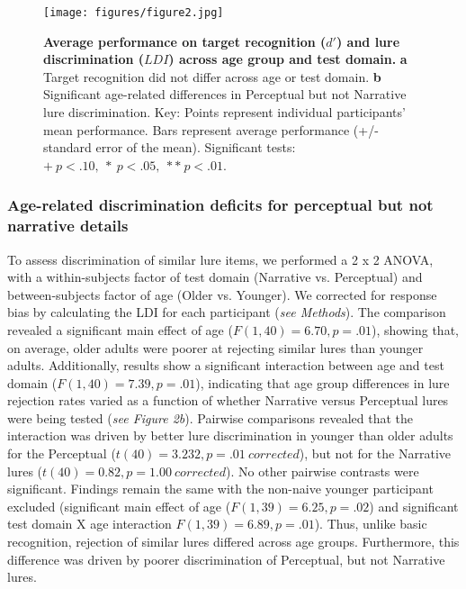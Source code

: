 \documentclass[11pt]{article}
\begin{document}
\begin{figure}
\centering
\texttt{[image: figures/figure2.jpg]}
\caption{\small \textbf{Average performance on target recognition ($d'$) and lure discrimination ($LDI$) across age group and test domain.} \textbf{a} Target recognition did not differ across age or test domain. \textbf{b} Significant age-related differences in Perceptual but not Narrative lure discrimination. Key: Points represent individual participants' mean performance. Bars represent average performance (+/- standard error of the mean). Significant tests: $+ \ p < .10, \ * \ p < .05, \ ** \ p < .01$.}
\label{fig:schematic}
\end{figure}

\subsubsection*{Age-related discrimination deficits for perceptual but not narrative details}
To assess discrimination of similar lure items, we performed a 2 x 2 ANOVA, with a within-subjects factor of test domain (Narrative vs. Perceptual) and between-subjects factor of age (Older vs. Younger). We corrected for response bias by calculating the LDI for each participant (\textit{see Methods}). The comparison revealed a significant main effect of age ($F(1, 40) = 6.70, p = .01$), showing that, on average, older adults were poorer at rejecting similar lures than younger adults. Additionally, results show a significant interaction between age and test domain ($F(1, 40) = 7.39, p = .01$), indicating that age group differences in lure rejection rates varied as a function of whether Narrative versus Perceptual lures were being tested (\textit{see Figure 2b}). Pairwise comparisons revealed that the interaction was driven by better lure discrimination in younger than older adults for the Perceptual ($t(40) = 3.232, p = .01 \ corrected$), but not for the Narrative lures ($t(40) = 0.82, p = 1.00 \ corrected$). No other pairwise contrasts were significant. Findings remain the same with the non-naive younger participant excluded (significant main effect of age ($F(1, 39) = 6.25, p = .02$) and significant test domain X age interaction $F(1, 39) = 6.89, p = .01$). Thus, unlike basic recognition, rejection of similar lures differed across age groups. Furthermore, this difference was driven by poorer discrimination of Perceptual, but not Narrative lures.
\end{document}
